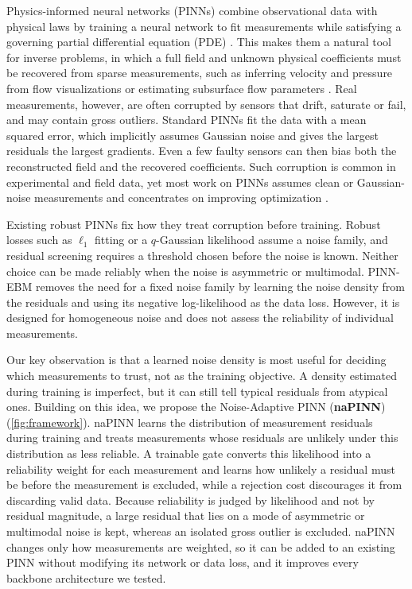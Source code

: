 \documentclass[twoside]{article}
\begin{document}
Physics-informed neural networks (PINNs) combine observational data with
physical laws by training a neural network to fit measurements while satisfying
a governing partial differential equation (PDE)
\citep{Raissi2019, Karniadakis2021}. This makes them a natural tool for inverse
problems, in which a full field and unknown physical coefficients must be
recovered from sparse measurements, such as inferring velocity and pressure from
flow visualizations \citep{Raissi2020} or estimating subsurface flow parameters
\citep{Tartakovsky2020}. Real measurements, however, are often corrupted by
sensors that drift, saturate or fail, and may contain gross outliers. Standard
PINNs fit the data with a mean squared error, which implicitly assumes Gaussian
noise and gives the largest residuals the largest gradients. Even a few faulty
sensors can then bias both the reconstructed field and the recovered
coefficients. Such corruption is common in experimental and field data, yet most
work on PINNs assumes clean or Gaussian-noise measurements and concentrates on
improving optimization \citep{Wang2021, McClenny2023}.

Existing robust PINNs fix how they treat corruption before training. Robust
losses such as $\ell_1$ fitting \citep{Peng2022} or a $q$-Gaussian likelihood
\citep{Duarte2025} assume a noise family, and residual screening
\citep{Peng2022} requires a threshold chosen before the noise is known. Neither
choice can be made reliably when the noise is asymmetric or multimodal.
PINN-EBM \citep{Pilar2024} removes the need for a fixed noise family by learning
the noise density from the residuals and using its negative log-likelihood as
the data loss. However, it is designed for homogeneous noise and does not assess
the reliability of individual measurements.

Our key observation is that a learned noise density is most useful for deciding
which measurements to trust, not as the training objective. A density estimated
during training is imperfect, but it can still tell typical residuals from
atypical ones. Building on this idea, we propose the Noise-Adaptive PINN
(\textbf{naPINN}) (\cref{fig:framework}). naPINN learns the distribution of
measurement residuals during training and treats measurements whose residuals
are unlikely under this distribution as less reliable. A trainable gate
converts this likelihood into a reliability weight for each measurement and
learns how unlikely a residual must be before the measurement is excluded,
while a rejection cost discourages it from discarding valid data. Because
reliability is judged by likelihood and not by residual magnitude, a large
residual that lies on a mode of asymmetric or multimodal noise is kept, whereas
an isolated gross outlier is excluded.
naPINN changes only how measurements are weighted, so it can be added to an
existing PINN without modifying its network or data loss, and it improves every
backbone architecture we tested.
\end{document}
